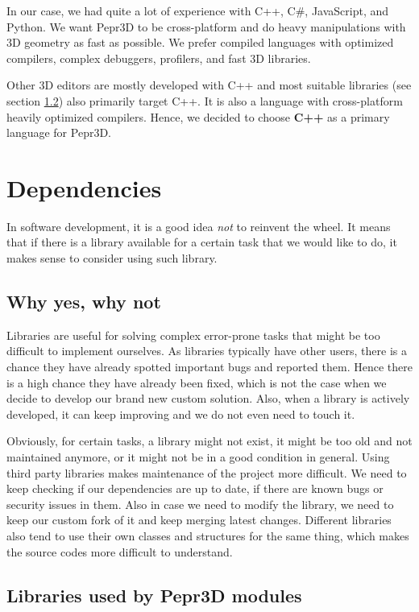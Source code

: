 \medskip

In our case, we had quite a lot of experience with C++, C\#, JavaScript, and Python.
We want Pepr3D to be cross-platform and do heavy manipulations with 3D geometry as fast as possible.
We prefer compiled languages with optimized compilers, complex debuggers, profilers, and fast 3D libraries.

Other 3D editors are mostly developed with C++ and most suitable libraries (see section \ref{libs}) also primarily target C++.
It is also a language with cross-platform heavily optimized compilers.
Hence, we decided to choose \textbf{C++} as a primary language for Pepr3D.

\section{Dependencies}

In software development, it is a good idea \emph{not} to reinvent the wheel.
It means that if there is a library available for a certain task that we would like to do, it makes sense to consider using such library.

\subsection{Why yes, why not}

Libraries are useful for solving complex error-prone tasks that might be too difficult to implement ourselves.
As libraries typically have other users, there is a chance they have already spotted important bugs and reported them.
Hence there is a high chance they have already been fixed, which is not the case when we decide to develop our brand new custom solution.
Also, when a library is actively developed, it can keep improving and we do not even need to touch it.

Obviously, for certain tasks, a library might not exist, it might be too old and not maintained anymore, or it might not be in a good condition in general.
Using third party libraries makes maintenance of the project more difficult.
We need to keep checking if our dependencies are up to date, if there are known bugs or security issues in them.
Also in case we need to modify the library, we need to keep our custom fork of it and keep merging latest changes.
Different libraries also tend to use their own classes and structures for the same thing, which makes the source codes more difficult to understand.

\subsection{Libraries used by Pepr3D modules} \label{libs}

